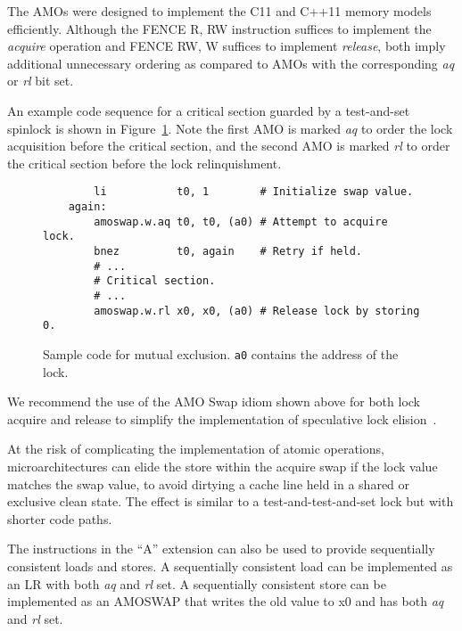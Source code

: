 \begin{commentary}
The AMOs were designed to implement the C11 and C++11 memory models
efficiently.  Although the FENCE R, RW instruction suffices to
implement the {\em acquire} operation and FENCE RW, W suffices to
implement {\em release}, both imply additional unnecessary ordering as
compared to AMOs with the corresponding {\em aq} or {\em rl} bit set.
\end{commentary}

An example code sequence for a critical section guarded by a
test-and-set spinlock is shown in Figure~\ref{critical}.  Note the
first AMO is marked {\em aq} to order the lock acquisition before the
critical section, and the second AMO is marked {\em rl} to order
the critical section before the lock relinquishment.

\begin{figure}[h!]
\begin{center}
\begin{verbatim}
        li           t0, 1        # Initialize swap value.
    again:
        amoswap.w.aq t0, t0, (a0) # Attempt to acquire lock.
        bnez         t0, again    # Retry if held.
        # ...
        # Critical section.
        # ...
        amoswap.w.rl x0, x0, (a0) # Release lock by storing 0.
\end{verbatim}
\end{center}
\caption{Sample code for mutual exclusion.  {\tt a0} contains the address of the lock.}
\label{critical}
\end{figure}

\begin{commentary}
We recommend the use of the AMO Swap idiom shown above for both lock
acquire and release to simplify the implementation of speculative lock
elision~\cite{Rajwar:2001:SLE}.

At the risk of complicating the implementation of atomic operations,
microarchitectures can elide the store within the acquire swap if the
lock value matches the swap value, to avoid dirtying a cache line held
in a shared or exclusive clean state.  The effect is similar to a
test-and-test-and-set lock but with shorter code paths.
\end{commentary}

The instructions in the ``A'' extension can also be used to provide
sequentially consistent loads and stores.  A sequentially consistent load can
be implemented as an LR with both {\em aq} and {\em rl} set. A sequentially
consistent store can be implemented as an AMOSWAP that writes the old value to
x0 and has both {\em aq} and {\em rl} set.
